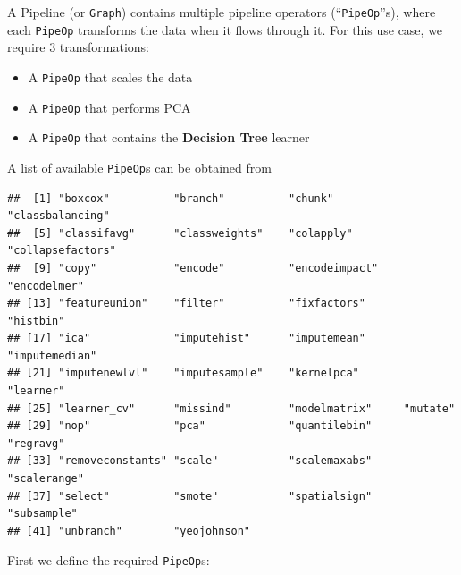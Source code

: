 \documentclass[]{scrbook}
\newenvironment{Shaded}{\begin{snugshade}}{\end{snugshade}}
\newcommand{\DataTypeTok}[1]{\textcolor[rgb]{0.13,0.29,0.53}{#1}}
\newcommand{\KeywordTok}[1]{\textcolor[rgb]{0.13,0.29,0.53}{\textbf{#1}}}
\newcommand{\NormalTok}[1]{#1}
\newcommand{\OperatorTok}[1]{\textcolor[rgb]{0.81,0.36,0.00}{\textbf{#1}}}
\newcommand{\StringTok}[1]{\textcolor[rgb]{0.31,0.60,0.02}{#1}}
\providecommand{\tightlist}{%
  \setlength{\itemsep}{0pt}\setlength{\parskip}{0pt}}
\renewenvironment{Shaded} {\begin{snugshade}\small} {\end{snugshade}}
\begin{document}
A Pipeline (or \texttt{Graph}) contains multiple pipeline operators (``\texttt{PipeOp}''s), where each \texttt{PipeOp} transforms the data when it flows through it.
For this use case, we require 3 transformations:

\begin{itemize}
\tightlist
\item
  A \texttt{PipeOp} that scales the data
\item
  A \texttt{PipeOp} that performs PCA
\item
  A \texttt{PipeOp} that contains the \textbf{Decision Tree} learner
\end{itemize}

A list of available \texttt{PipeOp}s can be obtained from

\begin{Shaded}
\end{Shaded}

\begin{verbatim}
##  [1] "boxcox"          "branch"          "chunk"           "classbalancing" 
##  [5] "classifavg"      "classweights"    "colapply"        "collapsefactors"
##  [9] "copy"            "encode"          "encodeimpact"    "encodelmer"     
## [13] "featureunion"    "filter"          "fixfactors"      "histbin"        
## [17] "ica"             "imputehist"      "imputemean"      "imputemedian"   
## [21] "imputenewlvl"    "imputesample"    "kernelpca"       "learner"        
## [25] "learner_cv"      "missind"         "modelmatrix"     "mutate"         
## [29] "nop"             "pca"             "quantilebin"     "regravg"        
## [33] "removeconstants" "scale"           "scalemaxabs"     "scalerange"     
## [37] "select"          "smote"           "spatialsign"     "subsample"      
## [41] "unbranch"        "yeojohnson"
\end{verbatim}

First we define the required \texttt{PipeOp}s:

\begin{Shaded}
\end{Shaded}
\end{document}
